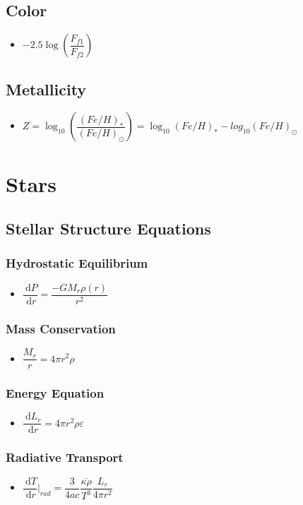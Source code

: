 \documentclass[]{report}
\newcommand \tab[1][1cm]{\hspace*{#1}}
\newcommand{\dn}[1]{\ \mathrm{d}#1}
\newcommand{\dd}[2]{ \dfrac{\dn #1}{\dn #2}}
\newcommand{\itemt}{\item \tab}
\begin{document}
\subsection{Color}			
\begin{itemize}
\itemt \( -2.5\log(\dfrac{F_{f1}}{F_{f2}}) \)
\end{itemize}			

\subsection{Metallicity}		
\begin{itemize}
\itemt \( Z = \log_{10}(\dfrac{(Fe/H)_*}{(Fe/H)_\odot}) = \log_{10}(Fe/H)_* - log_{10}(Fe/H)_\odot \)
\end{itemize}





	\section{Stars}


\subsection{Stellar Structure Equations}

\subsubsection{Hydrostatic Equilibrium}
\begin{itemize}
\itemt \( \dd{P}{r} = \dfrac{-G M_r \rho(r)}{r^2} \)
\end{itemize}

\subsubsection{Mass Conservation}
\begin{itemize}
\itemt \( \dfrac{M_r}{r} = 4 \pi r^2 \rho \)
\end{itemize}

\subsubsection{Energy Equation}
\begin{itemize}
\itemt \( \dd{L_r}{r} = 4 \pi r^2 \rho \varepsilon \)
\end{itemize}

\subsubsection{Radiative Transport}
\begin{itemize}
\itemt \( \dd{T}{r} |_{rad} = \dfrac{3}{4 a c} \dfrac{\bar{\kappa\rho}}{T^3} \dfrac{L_r}{4 \pi r^2} \)
\end{itemize}
\end{document}

